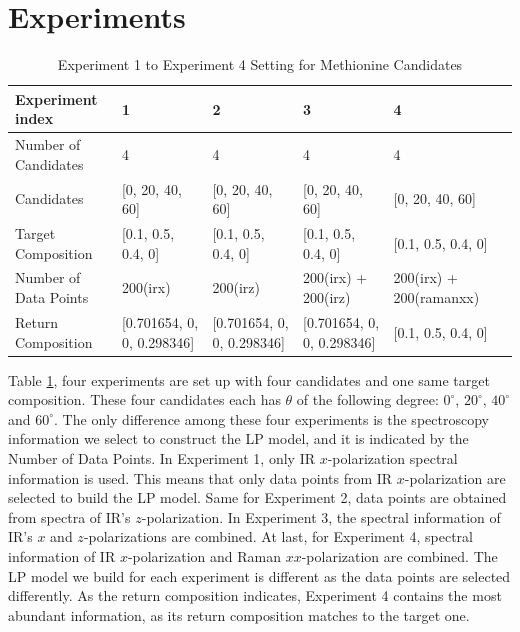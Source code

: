 \section{Experiments}
\begin{table}\tiny \label{tab:4.1}
\begin{center}
\begin{tabular}{| l | l | l | l | l | l }
\hline
Experiment index & 1 & 2 & 3 & 4 \\
\hline
Number of Candidates & 4 & 4 & 4 & 4 \\
\hline
Candidates & [0, 20, 40, 60] & [0, 20, 40, 60] & [0, 20, 40, 60] & [0, 20, 40, 60]\\
\hline
Target Composition & [0.1, 0.5, 0.4, 0] & [0.1, 0.5, 0.4, 0] & [0.1, 0.5, 0.4, 0] & [0.1, 0.5, 0.4, 0]\\
\hline
Number of Data Points & 200(irx) & 200(irz) & 200(irx) + 200(irz) & 200(irx) + 200(ramanxx)\\
\hline
Return Composition & [0.701654, 0, 0, 0.298346] & [0.701654, 0, 0, 0.298346] & [0.701654, 0, 0, 0.298346] & [0.1, 0.5, 0.4, 0]\\
\hline
\end{tabular} 
\end{center}
\caption{Experiment 1 to Experiment 4 Setting for Methionine Candidates} 
\end{table}	

Table \ref{tab:4.1}, four experiments are set up with four candidates and one same target composition. These four candidates each has $\theta$ of the following degree: $0^{\circ}$, $20^{\circ}$, $40^{\circ}$ and $60^{\circ}$. The only difference among these four experiments is the spectroscopy information we select to construct the LP model, and it is indicated by the Number of Data Points. In Experiment 1, only IR $x$-polarization spectral information is used. This means that only data points from IR $x$-polarization are selected to build the LP model. Same for Experiment 2, data points are obtained from spectra of IR's $z$-polarization. In Experiment 3, the spectral information of IR's $x$ and $z$-polarizations are combined. At last, for Experiment 4, spectral information of IR $x$-polarization and Raman $xx$-polarization are combined. The LP model we build for each experiment is different as the data points are selected differently. As the return composition indicates, 
Experiment 4 contains the most abundant information, as its return composition matches to the target one. \\

